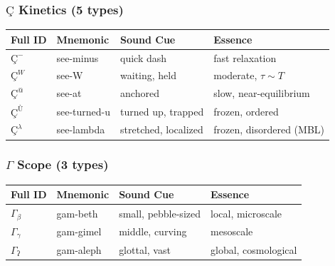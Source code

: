 \documentclass[12pt,a4paper]{article}
\begin{document}
\subsubsection{$Ç$ Kinetics (5 types)}

\begin{table}[htbp]
\centering
\small
{}
\begin{tabularx}{\textwidth}{>{\centering\arraybackslash}X >{\centering\arraybackslash}X >{\centering\arraybackslash}X >{\centering\arraybackslash}X}
\toprule
\rowcolor{gray!25}\textbf{Full ID} & \textbf{Mnemonic} & \textbf{Sound Cue} & \textbf{Essence} \\
\midrule
\rowcolors{1}{white}{gray!10}
$Ç^{-}$ & see-minus & quick dash & fast relaxation \\
$Ç^{W}$ & see-W & waiting, held & moderate, $\tau \sim T$ \\
$Ç^{@}$ & see-at & anchored & slow, near-equilibrium \\
$Ç^{\text{Ù}}$ & see-turned-u & turned up, trapped & frozen, ordered \\
$Ç^{\lambda}$ & see-lambda & stretched, localized & frozen, disordered (MBL) \\
\bottomrule
\end{tabularx}
\end{table}

\subsubsection{$\Gamma$ Scope (3 types)}

\begin{table}[htbp]
\centering
\small
{}
\begin{tabularx}{\textwidth}{>{\centering\arraybackslash}X >{\centering\arraybackslash}X >{\centering\arraybackslash}X >{\centering\arraybackslash}X}
\toprule
\rowcolor{gray!25}\textbf{Full ID} & \textbf{Mnemonic} & \textbf{Sound Cue} & \textbf{Essence} \\
\midrule
\rowcolors{1}{white}{gray!10}
$\Gamma_{\beta}$ & gam-beth & small, pebble-sized & local, microscale \\
$\Gamma_{\gamma}$ & gam-gimel & middle, curving & mesoscale \\
$\Gamma_{\text{ʔ}}$ & gam-aleph & glottal, vast & global, cosmological \\
\bottomrule
\end{tabularx}
\end{table}
\end{document}
